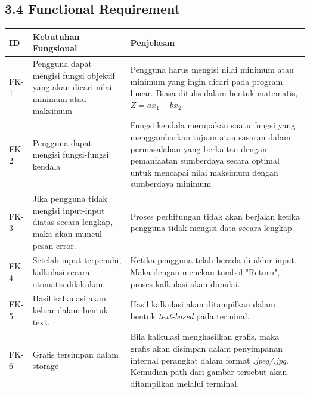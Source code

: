 \documentclass[a4paper]{article}
\begin{document}
    \subsection*{3.4 Functional Requirement}
    \begin{tabular}{ | m{3em}| m{} | m{} | }
        \hline
        \textbf{ID} & \textbf{Kebutuhan Fungsional} & \textbf{Penjelasan}\\
        \hline
        FK-1 & Pengguna dapat mengisi fungsi objektif yang akan
        dicari nilai minimum atau maksimum & Pengguna harus mengisi
        nilai minimum atau minimum yang ingin dicari pada program
        linear. Biasa ditulis dalam bentuk matematis, $Z = ax_{1}+bx_{2}$\\
        \hline
        FK-2 & Pengguna dapat mengisi fungsi-fungsi kendala &
        Fungsi kendala merupakan suatu fungsi yang menggambarkan
        tujuan atau sasaran dalam permasalahan yang berkaitan
        dengan pemanfaatan sumberdaya secara optimal untuk 
        mencapai nilai maksimum dengan sumberdaya minimum\\
        \hline
        FK-3 & 
        Jika pengguna tidak mengisi input-input diatas secara
        lengkap, maka akan muncul pesan error.
         &
         Proses perhitungan tidak akan berjalan ketika pengguna
         tidak mengisi data secara lengkap.
         \\
        \hline
        FK-4
        &
        Setelah input terpenuhi, kalkulasi secara otomatis
        dilakukan.
        &
        Ketika pengguna telah berada di akhir input. Maka dengan
        menekan tombol "Return", proses kalkulasi akan dimulai.
        \\
        \hline
        FK-5 
        &
        Hasil kalkulasi akan keluar dalam bentuk text.
        &
        Hasil kalkulasi akan ditampilkan dalam bentuk
        \textit{text-based} pada terminal.
        \\
        \hline
        FK-6
        &
        Grafis tersimpan dalam storage
        &
        Bila kalkulasi menghasilkan grafis, maka grafis akan
        disimpan dalam penyimpanan internal perangkat dalam format
        \textit{.jpeg/.jpg}. Kemudian path dari gambar tersebut
        akan ditampilkan melalui terminal.
        \\
        \hline

    \end{tabular}
\end{document}
